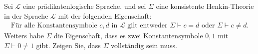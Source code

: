 
\begin{exercise}[137]

Sei $\mathcal{L}$ eine prädikatenlogische Sprache, und sei $\Sigma$ eine
konsistente Henkin-Theorie in der Sprache $\mathcal{L}$ mit der folgenden
Eigenschaft:
\begin{align*}
  \text{Für alle Konstantensymbole } c,d \text{ in } \mathcal{L}
  \text{ gilt entweder } \Sigma \vdash c = d \text{ oder } \Sigma \vdash c \neq d.
\end{align*}
Weiters habe $\Sigma$ die Eigenschaft, dass es zwei Konstantensymbole $0, 1$
mit $\Sigma \vdash 0 \neq 1$ gibt. Zeigen Sie, dass $\Sigma$ vollständig sein muss.

\end{exercise}


\begin{solution}

\phantom{}

\end{solution}

